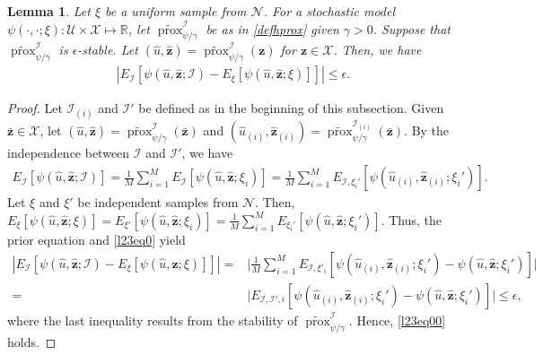 \documentclass[10pt,reqno]{amsart}
\newcommand{\1}{{\chi}}
\def\leq{\leqslant}
\numberwithin{equation}{section}
\theoremstyle{thmlemcorr}
\numberwithin{theorem}{section}
\newtheorem{lemma}[theorem]{Lemma}
\theoremstyle{thmlemcorr*}
\theoremstyle{defi}
\theoremstyle{remexample}
\theoremstyle{ass}
\begin{document}
\begin{lemma}
	\label{mmberdb}
	Let $\xi$ be a uniform sample from $\mathcal{N}$. For a stochastic model $\psi(\cdot, \cdot;\xi):\mathcal{U}\times\mathcal{X}\mapsto\mathbb{R}$, let $\widetilde{\operatorname{prox}}_{\psi/\gamma}^{\mathcal{I}}$ be as in \eqref{defhprox} given $\gamma>0$. 
	Suppose that $\widetilde{\operatorname{prox}}_{\psi/\gamma}^{\mathcal{I}}$ is $\epsilon$-stable. Let $(\hat{u}, \hat{\boldsymbol{z}}) = \widetilde{\operatorname{prox}}^{\mathcal{I}}_{\psi/\gamma}(\boldsymbol{z})$ for $\boldsymbol{z}\in \mathcal{X}$. Then, we have
	\begin{align}
		\label{l23eq00}
		|E_{{\mathcal{I}}}[\psi(\hat{u}, \hat{\boldsymbol{z}}; {\mathcal{I}}) - E_{\xi}[\psi(\hat{u}, \hat{\boldsymbol{z}}; \xi)]]|\leq \epsilon. 
	\end{align}
\end{lemma}
\begin{proof}
	Let ${\mathcal{I}}_{(i)}$ and  ${\mathcal{I}}'$ be defined as in the beginning of this subsection. 
	Given $\bar{\boldsymbol{z}}\in \mathcal{X}$, let
		$(\hat{u}, \hat{\boldsymbol{z}}) = \widetilde{\operatorname{prox}}_{\psi/\gamma}^{\mathcal{I}}(\bar{\boldsymbol{z}})$ and 
		$(\hat{u}_{(i)}, \hat{\boldsymbol{z}}_{(i)}) = \widetilde{\operatorname{prox}}_{\psi/\gamma}^{{\mathcal{I}}_{(i)}}(\bar{\boldsymbol{z}})$. 
	By the independence between ${\mathcal{I}}$ and ${\mathcal{I}}'$, we have 
	\begin{align}
		\label{l23eq0}
		E_{{\mathcal{I}}}[\psi(\hat{u}, \hat{\boldsymbol{z}}; {\mathcal{I}})] = \frac{1}{M}\sum_{i=1}^ME_{\mathcal{I}}[\psi(\hat{u}, \hat{\boldsymbol{z}}; \xi_i)]=\frac{1}{M}\sum_{i=1}^ME_{{\mathcal{I}},\xi_i'}[\psi(\hat{u}_{(i)}, \hat{\boldsymbol{z}}_{(i)}; \xi_i')].
	\end{align}
	Let $\xi$ and $\xi'$ be independent samples from ${\mathcal{N}}$. Then,   $E_\xi[\psi(\hat{u}, \hat{\boldsymbol{z}}; \xi)] = E_{\xi'}[\psi(\hat{u}, \hat{\boldsymbol{z}}; \xi_i)] = \frac{1}{M}\sum_{i=1}^ME_{\xi_i'}[\psi(\hat{u}, \hat{\boldsymbol{z}}; \xi_i')]$.  
	Thus,  the prior equation and  \eqref{l23eq0} yield
	\begin{align}
		|E_{{\mathcal{I}}}[\psi(\hat{u}, \hat{\boldsymbol{z}}; {\mathcal{I}}) - E_{\xi}[\psi(\hat{u}, \hat{\boldsymbol{z}}; \xi)] ]|
		=& \bigg|\frac{1}{M}\sum_{i=1}^ME_{{\mathcal{I}}, \xi'_i}[\psi(\hat{u}_{(i)}, \hat{\boldsymbol{z}}_{(i)};\xi_i') - \psi(\hat{u}, \hat{\boldsymbol{z}}; \xi_i')]\bigg|\nonumber\\
		=& |E_{{\mathcal{I}}, {\mathcal{I}}', i}[\psi(\hat{u}_{(i)}, \hat{\boldsymbol{z}}_{(i)}; \xi_i') - \psi(\hat{u}, \hat{\boldsymbol{z}}; \xi_i')]\bigg|\leq \epsilon, \nonumber
	\end{align}
	where the last inequality results from the stability of $\widetilde{\operatorname{prox}}_{\psi/\gamma}^{\mathcal{I}}$. Hence, \eqref{l23eq00}  holds. 
\end{proof}
\end{document}
